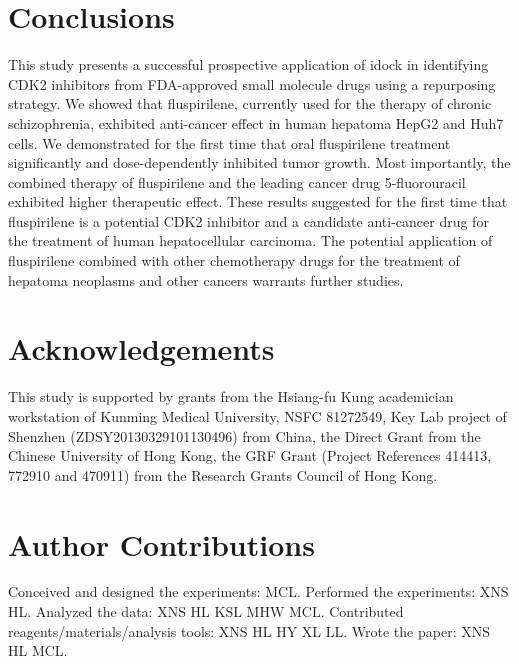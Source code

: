 \documentclass[10pt]{article}
\begin{document}
\section*{Conclusions}

This study presents a successful prospective application of idock \cite{1153,1362} in identifying CDK2 inhibitors from FDA-approved small molecule drugs using a repurposing strategy. We showed that fluspirilene, currently used for the therapy of chronic schizophrenia, exhibited anti-cancer effect in human hepatoma HepG2 and Huh7 cells. We demonstrated for the first time that oral fluspirilene treatment significantly and dose-dependently inhibited tumor growth. Most importantly, the combined therapy of fluspirilene and the leading cancer drug 5-fluorouracil exhibited higher therapeutic effect. These results suggested for the first time that fluspirilene is a potential CDK2 inhibitor and a candidate anti-cancer drug for the treatment of human hepatocellular carcinoma. The potential application of fluspirilene combined with other chemotherapy drugs for the treatment of hepatoma neoplasms and other cancers warrants further studies.

\section*{Acknowledgements}

This study is supported by grants from the Hsiang-fu Kung academician workstation of Kunming Medical University, NSFC 81272549, Key Lab project of Shenzhen (ZDSY20130329101130496) from China, the Direct Grant from the Chinese University of Hong Kong, the GRF Grant (Project References 414413, 772910 and 470911) from the Research Grants Council of Hong Kong.

\section*{Author Contributions}

Conceived and designed the experiments: MCL. Performed the experiments: XNS HL. Analyzed the data: XNS HL KSL MHW MCL. Contributed reagents/materials/analysis tools: XNS HL HY XL LL. Wrote the paper: XNS HL MCL.


\end{document}
